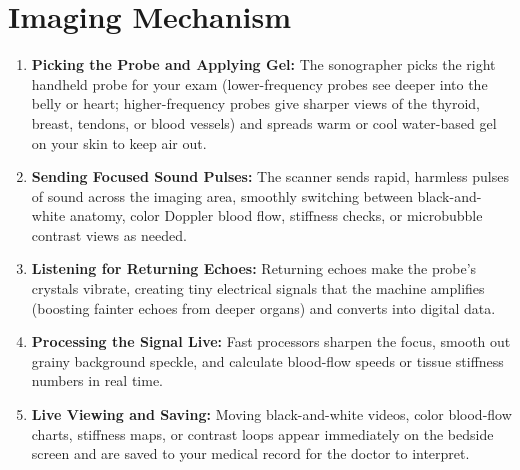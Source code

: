 \section{Imaging Mechanism}
\begin{enumerate}
  \item \textbf{Picking the Probe and Applying Gel:} The sonographer picks the right handheld probe for your exam (lower-frequency probes see deeper into the belly or heart; higher-frequency probes give sharper views of the thyroid, breast, tendons, or blood vessels) and spreads warm or cool water-based gel on your skin to keep air out.
  \item \textbf{Sending Focused Sound Pulses:} The scanner sends rapid, harmless pulses of sound across the imaging area, smoothly switching between black-and-white anatomy, color Doppler blood flow, stiffness checks, or microbubble contrast views as needed.
  \item \textbf{Listening for Returning Echoes:} Returning echoes make the probe's crystals vibrate, creating tiny electrical signals that the machine amplifies (boosting fainter echoes from deeper organs) and converts into digital data.
  \item \textbf{Processing the Signal Live:} Fast processors sharpen the focus, smooth out grainy background speckle, and calculate blood-flow speeds or tissue stiffness numbers in real time.
  \item \textbf{Live Viewing and Saving:} Moving black-and-white videos, color blood-flow charts, stiffness maps, or contrast loops appear immediately on the bedside screen and are saved to your medical record for the doctor to interpret.
\end{enumerate}

